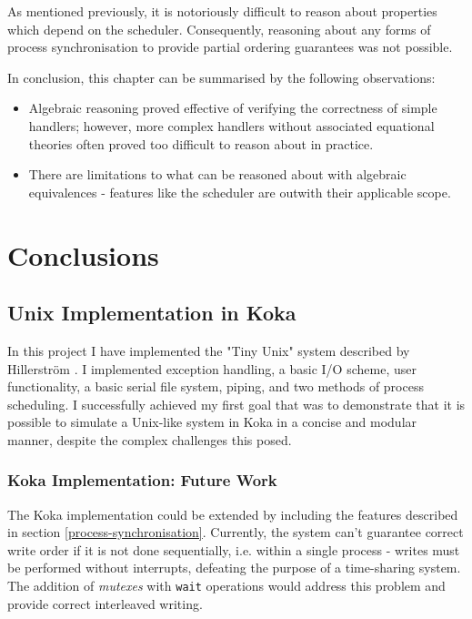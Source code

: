 \documentclass[logo,bsc,singlespacing,parskip]{infthesis}
\begin{document}
As mentioned previously, it is notoriously difficult  to reason about properties which depend on the scheduler. Consequently, reasoning about any forms of process synchronisation to provide partial ordering guarantees was not possible.

In conclusion, this chapter can be summarised by the following observations:
\begin{itemize}
    \item Algebraic reasoning proved effective of verifying the correctness of simple handlers; however, more complex handlers without associated equational theories often proved too difficult to reason about in practice.
    \item There are limitations to what can be reasoned about with algebraic equivalences - features like the scheduler are outwith their applicable scope.
\end{itemize}


\chapter{Conclusions}

\section{Unix Implementation in Koka}
In this project I have implemented the "Tiny Unix" system described by Hillerström \cite{hillerstrom_foundations_nodate}. I implemented exception handling, a basic I/O scheme, user functionality, a basic serial file system, piping, and two methods of process scheduling. I successfully achieved my first goal that was to demonstrate that it is possible to simulate a Unix-like system in Koka in a concise and modular manner, despite the complex challenges this posed.

\subsection*{Koka Implementation: Future Work}
The Koka implementation could be extended by including the features described in section \ref{process-synchronisation}. Currently, the system can't guarantee correct write order if it is not done sequentially, i.e. within a single process - writes must be performed without interrupts, defeating the purpose of a time-sharing system. The addition of \textit{mutexes} with \lstinline{wait} operations would address this problem and provide correct interleaved writing.
\end{document}
